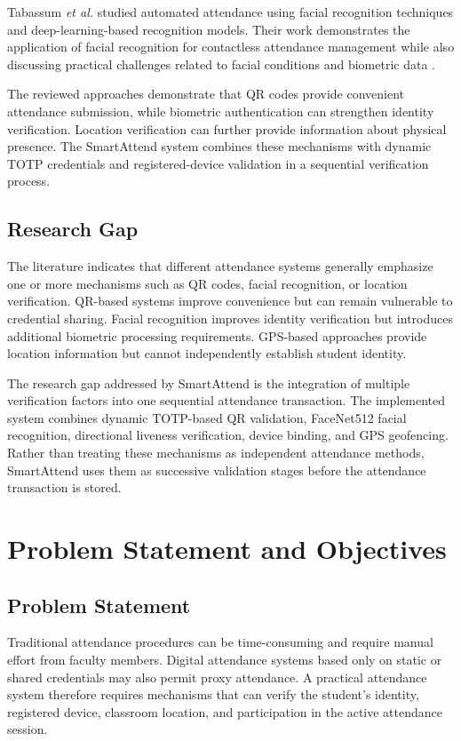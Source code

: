 \documentclass[conference]{IEEEtran}
\begin{document}
Tabassum \textit{et al.} studied automated attendance using facial recognition techniques and deep-learning-based recognition models. Their work demonstrates the application of facial recognition for contactless attendance management while also discussing practical challenges related to facial conditions and biometric data \cite{tabassum2025}.

The reviewed approaches demonstrate that QR codes provide convenient attendance submission, while biometric authentication can strengthen identity verification. Location verification can further provide information about physical presence. The SmartAttend system combines these mechanisms with dynamic TOTP credentials and registered-device validation in a sequential verification process.


\subsection{Research Gap}

The literature indicates that different attendance systems generally emphasize one or more mechanisms such as QR codes, facial recognition, or location verification. QR-based systems improve convenience but can remain vulnerable to credential sharing. Facial recognition improves identity verification but introduces additional biometric processing requirements. GPS-based approaches provide location information but cannot independently establish student identity.

The research gap addressed by SmartAttend is the integration of multiple verification factors into one sequential attendance transaction. The implemented system combines dynamic TOTP-based QR validation, FaceNet512 facial recognition, directional liveness verification, device binding, and GPS geofencing. Rather than treating these mechanisms as independent attendance methods, SmartAttend uses them as successive validation stages before the attendance transaction is stored.


\section{Problem Statement and Objectives}

\subsection{Problem Statement}

Traditional attendance procedures can be time-consuming and require manual effort from faculty members. Digital attendance systems based only on static or shared credentials may also permit proxy attendance. A practical attendance system therefore requires mechanisms that can verify the student's identity, registered device, classroom location, and participation in the active attendance session.
\end{document}
